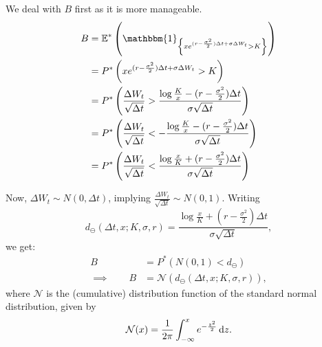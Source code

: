 We deal with $ B $ first as it is more manageable.
\begin{align*}
	B  &=  \E^* \left( \mathbbm{1}_{ \left\lbrace  x e^{ ( r - \frac{\sigma^2}{2} ) \Delta t + \sigma \Delta W_t } > K  \right\rbrace }  \right)  \\
	&=  P^* \left( x e^{ ( r - \frac{\sigma^2}{2} ) \Delta t + \sigma \Delta W_t } > K  \right)  \\
	&=  P^* \left( \frac{ \Delta W_t }{ \sqrt{\Delta t} }  >  \frac{ \log \frac{K}{x} - ( r - \frac{\sigma^2}{2} ) \Delta t }{ \sigma \sqrt{\Delta t} }  \right)  \\
	&=  P^* \left( \frac{ \Delta W_t }{ \sqrt{\Delta t} }  <  - \frac{ \log \frac{K}{x} - ( r - \frac{\sigma^2}{2} ) \Delta t }{ \sigma \sqrt{\Delta t} }  \right)  \\
	&=  P^* \left( \frac{ \Delta W_t }{ \sqrt{\Delta t} }  <  \frac{ \log \frac{x}{K} + ( r - \frac{\sigma^2}{2} ) \Delta t }{ \sigma \sqrt{\Delta t} }  \right)
\end{align*}

Now, $ \Delta W_t \sim N(0, \Delta t) $, implying $ \frac{ \Delta W_t }{ \sqrt{\Delta t} } \sim N(0, 1) $. Writing 
\begin{equation*}
	d_{\ominus} ( \Delta t, x; K, \sigma, r ) = \frac{ \log \frac{x}{K} + ( r - \frac{\sigma^2}{2} ) \Delta t }{ \sigma \sqrt{\Delta t} } ,
\end{equation*}
we get:
\begin{align*}
	B  &=  P^* \left( N(0, 1)  <  d_{\ominus} \right)  \\
	\implies  \qquad  B  &=  \mathcal{N}(d_{\ominus} ( \Delta t, x; K, \sigma, r )),
\end{align*}
where $ \mathcal{N} $ is the (cumulative) distribution function of the standard normal distribution, given by
\begin{equation}
	\mathcal{N}(x) = \frac{1}{2 \pi} \int_{- \infty}^{x} e^{-\frac{z^2}{2}} \dif z .
\end{equation}


